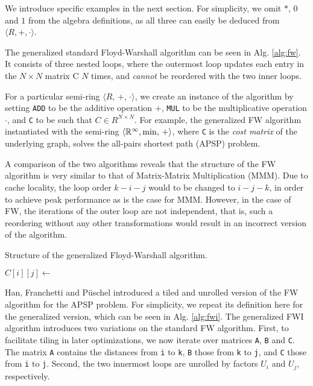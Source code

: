 We introduce specific examples in the next section. For simplicity, we omit $*$, $0$
and $1$ from the algebra definitions, as all three can easily be deduced from
$\langle R, +, \cdot \rangle$.

The generalized standard Floyd-Warshall algorithm can be seen in Alg. \ref{alg:fw}.
It consists of three nested loops, where the outermost loop updates each entry in
the $N \times N$ matrix C $N$ times, and \textit{cannot} be reordered with the two
inner loops. 

For a particular semi-ring \(\langle R,\,+,\,\cdot\rangle\), we create an instance
of the algorithm by setting \texttt{ADD} to be the additive operation $+$,
\texttt{MUL} to be the multiplicative operation $\cdot$, and \texttt{C} to be such
that $C \in R^{N \times N}$. For example, the generalized FW algorithm instantiated
with the semi-ring \(\langle\mathbb{R}^{\infty},\min,\,+\rangle\), where
\texttt{C} is the \textit{cost matrix} of the underlying graph, solves the all-pairs
shortest path (APSP) problem.

A comparison of the two algorithms reveals that the structure of the FW algorithm is
very similar to that of Matrix-Matrix Multiplication (MMM). Due to cache locality,
the loop order $k-i-j$ would to be changed to $i-j-k$, in order to achieve peak performance
as is the case for MMM. However, in the case of FW, the iterations of the outer loop
are not independent, that is, such a reordering without any other transformations
would result in an incorrect version of the algorithm.

\begin{algorithm}
  \caption{Structure of the generalized Floyd-Warshall algorithm.}\label{alg:fw}
  \begin{algorithmic}[1]
      \EndFor
      \EndFor
        \State $C[i][j] \gets$ 
      \EndFor
    \EndFunction
  \end{algorithmic}
\end{algorithm}

Han, Franchetti and Püschel \cite{han06generation} introduced a tiled and unrolled
version of the FW algorithm for the APSP problem. For simplicity, we repeat its definition
here for the generalized version, which can be seen in Alg. \ref{alg:fwi}. The generalized
FWI algorithm introduces two variations on the standard FW algorithm. First, to facilitate
tiling in later optimizations, we now iterate over matrices \texttt{A}, \texttt{B} and
\texttt{C}. The matrix \texttt{A} contains the distances from \texttt{i} to \texttt{k},
\texttt{B} those from \texttt{k} to \texttt{j}, and \texttt{C} those from \texttt{i} to
\texttt{j}. Second, the two innermost loops are unrolled by factors $U_i$ and $U_j$, respectively.

